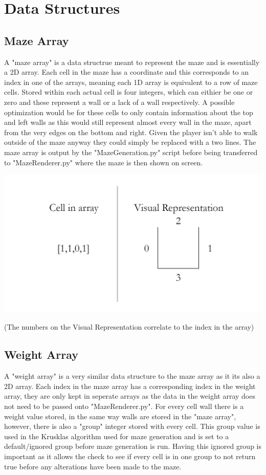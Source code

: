 \documentclass{article}
\begin{document}
\clearpage
\section{Data Structures}
\subsection{Maze Array}
A "maze array" is a data structrue meant to represent the maze and is essentially a 2D array. Each cell in the maze has a coordinate and this corresponds to an index in one of the arrays,
meaning each 1D array is equivalent to a row of maze cells. Stored within each actual cell is four integers, which can eithier be one or zero and these represent a wall or a lack of a wall
respectively. A possible optimization would be for these cells to only contain information about the top and left walls as this would still represent almost every wall in the maze, apart from
the very edges on the bottom and right. Given the player isn't able to walk outside of the maze anyway they could simply be replaced with a two lines. The maze array is output by the 
"MazeGeneration.py" script before being transferred to "MazeRenderer.py" where the maze is then shown on screen.
\begin{center}
	\includegraphics[scale=0.5]{Maze Cell Diagram}

	\color{mygrey}(The numbers on the Visual Representation correlate to the index in the array)
\end{center}
\subsection{Weight Array}
A "weight array" is a very similar data structure to the maze array as it its also a 2D array. Each index in the maze array has a corresponding index in the weight array, they are only kept
in seperate arrays as the data in the weight array does not need to be passed onto "MazeRenderer.py". For every cell wall there is a weight value stored, in the same way walls are stored in 
the "maze array", however, there is also a "group" integer stored with every cell. This group value is used in the Krusklas algorithm used for maze generation and is set to a default/ignored group before maze
generation is run. Having this ignored group is important as it allows the check to see if every cell is in one group to not return true before any alterations have been made to
the maze.
\end{document}
